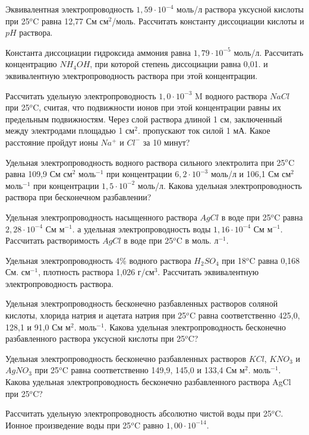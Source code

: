 \begin{Task}
Эквивалентная электропроводность $1,59\cdot 10^{-4}$ моль/л раствора уксусной кислоты при 25$^{o}$C равна 12,77 См см$^{2}$/моль. Рассчитать константу диссоциации кислоты и $pH$ раствора.
\end{Task}
\begin{Task}
Константа диссоциации гидроксида аммония равна $1,79\cdot 10^{-5}$ моль/л. Рассчитать концентрацию $NH_{4}OH$, при которой степень диссоциации равна 0,01. и эквивалентную электропроводность раствора при этой концентрации. 
\end{Task}
\begin{Task}
Рассчитать удельную электропроводность $1,0\cdot 10^{-3}$ M водного раствора $NaCl$ при 25$^{o}$C, считая, что подвижности ионов при этой концентрации равны их предельным подвижностям. Через слой раствора длиной 1 см, заключенный между электродами площадью 1 см$^{2}$. пропускают ток силой 1 мА. Какое расстояние пройдут ионы $Na^{+}$ и $Cl^{-}$ за 10 минут? 
\end{Task}
\begin{Task}
Удельная электропроводность водного раствора сильного электролита при 25$^{o}$C равна 109,9 См см$^{2}$ моль$^{-1}$ при концентрации $6,2\cdot 10^{-3}$ моль/л и 106,1 См см$^{2}$ моль$^{-1}$ при концентрации $1,5\cdot 10^{-2}$ моль/л. Какова удельная электропроводность раствора при бесконечном разбавлении?
\end{Task}
\begin{Task}
Удельная электропроводность насыщенного раствора $AgCl$ в воде при 25$^{o}$C равна $2,28\cdot 10^{-4}$ См м$^{-1}$. а удельная электропроводность воды $1,16\cdot 10^{-4}$ См м$^{-1}$. Рассчитать растворимость $AgCl$ в воде при 25$^{o}$C в моль. л$^{-1}$. 
\end{Task}
\begin{Task}
Удельная электропроводность 4\% водного раствора $H_{2}SO_{4}$ при 18$^{o}$C равна 0,168 См. см$^{-1}$, плотность раствора 1,026 г/см$^{3}$. Рассчитать эквивалентную электропроводность раствора. 
\end{Task}
\begin{Task}
Удельная электропроводность бесконечно разбавленных растворов соляной кислоты, хлорида натрия и ацетата натрия при 25$^{o}$C равна соответственно 425,0, 128,1 и 91,0 См м$^{2}$. моль$^{-1}$. Какова удельная электропроводность бесконечно разбавленного раствора уксусной кислоты при 25$^{o}$C? 
\end{Task}
\begin{Task}
Удельная электропроводность бесконечно разбавленных растворов $KCl$, $KNO_{3}$ и $AgNO_{3}$ при 25$^{o}$C равна соответственно 149,9, 145,0 и 133,4 См м$^{2}$. моль$^{-1}$. Какова удельная электропроводность бесконечно разбавленного раствора AgCl при 25$^{o}$C? 
\end{Task}
\begin{Task}
Рассчитать удельную электропроводность абсолютно чистой воды при 25$^{o}$C. Ионное произведение воды при 25$^{o}$C равно $1,00\cdot 10^{-14}$. 
\end{Task}


